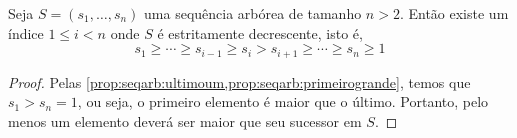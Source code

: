 \begin{corollary} \label{corol:seqarb:decresce}
    Seja $S = (s_1, \ldots, s_n)$ uma sequência arbórea de tamanho $n > 2$. Então existe um índice $1 \leq i < n$ onde $S$ é estritamente decrescente, isto é,
    \[
        s_1 \geq \cdots \geq s_{i-1} \geq s_i > s_{i+1} \geq \cdots \geq s_n \geq 1
    \]
\end{corollary}

\begin{proof}
    Pelas \cref{prop:seqarb:ultimoum,prop:seqarb:primeirogrande}, temos que $s_1 > s_n = 1$, ou seja, o primeiro elemento é maior que o último. Portanto, pelo menos um elemento deverá ser maior que seu sucessor em $S$.
\end{proof}
